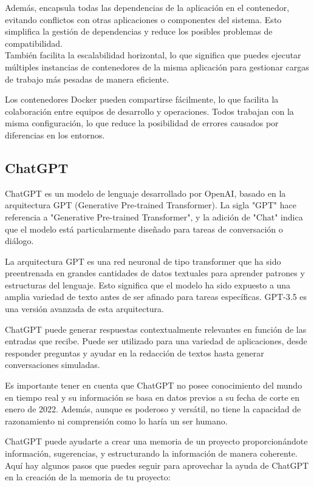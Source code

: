 Además, encapsula todas las dependencias de la aplicación en el contenedor, 
evitando conflictos con otras aplicaciones o componentes del sistema. 
Esto simplifica la gestión de dependencias y reduce los posibles problemas de compatibilidad. \\
También facilita la escalabilidad horizontal, lo que significa que puedes 
ejecutar múltiples instancias de contenedores de la misma aplicación para 
gestionar cargas de trabajo más pesadas de manera eficiente.

Los contenedores Docker pueden compartirse fácilmente, lo que facilita la colaboración 
entre equipos de desarrollo y operaciones. 
Todos trabajan con la misma configuración, lo que reduce la posibilidad de errores 
causados por diferencias en los entornos.

\subsection{ChatGPT~\cite{chatgpt1}}
ChatGPT es un modelo de lenguaje desarrollado por OpenAI, basado en la arquitectura GPT (Generative Pre-trained Transformer). La sigla "GPT" hace referencia a "Generative Pre-trained Transformer", y la adición de "Chat" indica que el modelo está particularmente diseñado para tareas de conversación o diálogo.

La arquitectura GPT es una red neuronal de tipo transformer que ha sido preentrenada en grandes cantidades de datos textuales para aprender patrones y estructuras del lenguaje. Esto significa que el modelo ha sido expuesto a una amplia variedad de texto antes de ser afinado para tareas específicas. GPT-3.5 es una versión avanzada de esta arquitectura.

ChatGPT puede generar respuestas contextualmente relevantes en función de las entradas que recibe. Puede ser utilizado para una variedad de aplicaciones, desde responder preguntas y ayudar en la redacción de textos hasta generar conversaciones simuladas.

Es importante tener en cuenta que ChatGPT no posee conocimiento del mundo en tiempo real y su información se basa en datos previos a su fecha de corte en enero de 2022. Además, aunque es poderoso y versátil, no tiene la capacidad de razonamiento ni comprensión como lo haría un ser humano.

ChatGPT puede ayudarte a crear una memoria de un proyecto proporcionándote información, sugerencias, y estructurando la información de manera coherente. Aquí hay algunos pasos que puedes seguir para aprovechar la ayuda de ChatGPT en la creación de la memoria de tu proyecto:

